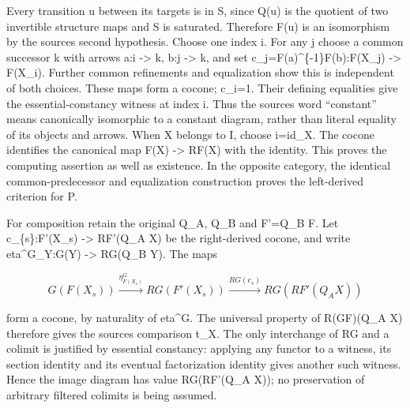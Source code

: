 Every transition u between its targets is in S,\allowbreak{} since Q(u)\allowbreak{} is the quotient of two invertible structure maps and S is saturated. Therefore F(u)\allowbreak{} is an isomorphism by the source\textquotesingle s second hypothesis. Choose one index i. For any j choose a common successor k with arrows a:\allowbreak{}i \allowbreak{}-> k,\allowbreak{} b:\allowbreak{}j \allowbreak{}-> k,\allowbreak{} and set c\_\allowbreak{}j\allowbreak{}=F(a)\allowbreak{}\textasciicircum{}\{-1\}F(b)\allowbreak{}:\allowbreak{}F(X\_\allowbreak{}j)\allowbreak{} \allowbreak{}-> F(X\_\allowbreak{}i)\allowbreak{}. Further common refinements and equalization show this is independent of both choices. These maps form a cocone; c\_\allowbreak{}i\allowbreak{}=1. Their defining equalities give the essential-constancy witness at index i. Thus the source\textquotesingle s word ``constant'' means canonically isomorphic to a constant diagram,\allowbreak{} rather than literal equality of its objects and arrows. When X belongs to I,\allowbreak{} choose i\allowbreak{}=id\_\allowbreak{}X. The cocone identifies the canonical map F(X)\allowbreak{} \allowbreak{}-> RF(X)\allowbreak{} with the identity. This proves the computing assertion as well as existence. In the opposite category,\allowbreak{} the identical common-predecessor and equalization construction proves the left-derived criterion for P.

For composition retain the original Q\_\allowbreak{}A,\allowbreak{} Q\_\allowbreak{}B and F'\allowbreak{}=Q\_\allowbreak{}B F. Let c\_\allowbreak{}\{s\}:\allowbreak{}F'(X\_\allowbreak{}s)\allowbreak{} \allowbreak{}-> RF'(Q\_\allowbreak{}A X)\allowbreak{} be the right-derived cocone,\allowbreak{} and write eta\textasciicircum{}G\_\allowbreak{}Y:\allowbreak{}G(Y)\allowbreak{} \allowbreak{}-> RG(Q\_\allowbreak{}B Y)\allowbreak{}. The maps

\[
 G(F(X_s))\xrightarrow{\eta^G_{F(X_s)}}RG(F'(X_s))
        \xrightarrow{RG(c_s)}RG(RF'(Q_A X))                 \tag{1.1}
\]

form a cocone,\allowbreak{} by naturality of eta\^{}G. The universal property of R(GF)\allowbreak{}(Q\_\allowbreak{}A X)\allowbreak{} therefore gives the source\textquotesingle s comparison t\_\allowbreak{}X. The only interchange of RG and a colimit is justified by essential constancy:\allowbreak{} applying any functor to a witness,\allowbreak{} its section identity and its eventual factorization identity gives another such witness. Hence the image diagram has value RG(RF'(Q\_\allowbreak{}A X)\allowbreak{})\allowbreak{}; no preservation of arbitrary filtered colimits is being assumed.

